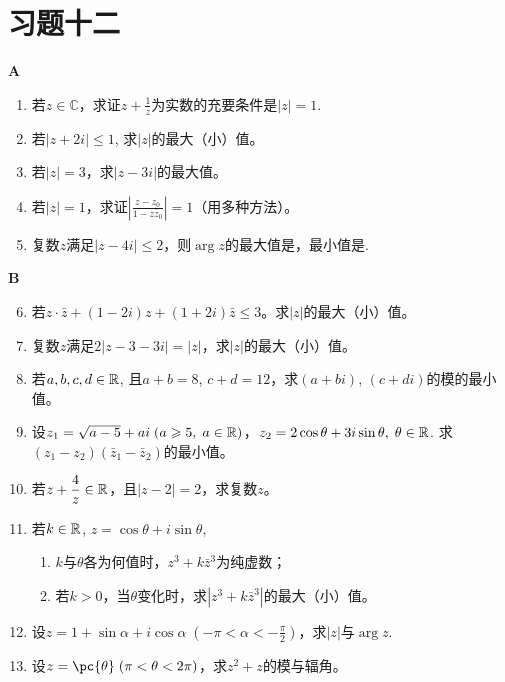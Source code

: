 \section*{习题十二}
\begin{center}
    \bfseries A
\end{center}

\begin{enumerate}
    \item 若$z\in\mathbb{C}$，求证$z+\frac{1}{z}$为实数的充要条件是$|z|=1$.
    \item   若$|z+2i|\le 1$, 求$|z|$的最大（小）值。
    \item   若$|z|=3$，求$|z-3i|$的最大值。
    \item   若$|z|=1$，求证$\left|\frac{z-z_0}{1-z\bar z_0}\right|=1$（用多种方法）。
    \item   复数$z$满足$|z-4i|\le 2$，则$\arg z$的最大值是\blank，最小值是\blank.
\end{enumerate}

\begin{center}
    \bfseries B
\end{center}

\begin{enumerate}\setcounter{enumi}{5}
    \item 若$z\cdot \bar z+(1-2i)z+(1+2i)\bar z\le 3$。求$|z|$的最大（小）值。
\item 复数$z$满足$2|z-3-3i|=|z|$，求$|z|$的最大（小）值。
\item 若$a,b,c,d\in\mathbb{R}$, 且$a+b=8$, $c+d=12$，求$(a+bi)$, $(c+di)$的模的最小值。
\item 设$z_1=\sqrt{a-5}+ai\; (a\geqslant 5,\; a\in\mathbb{R})$，$z_2=2\cos\theta+3i\sin\theta,\; \theta\in\mathbb{R}$. 求$(z_1-z_2)(\bar z_1-\bar z_2)$的最小值。
\item 若$z+\dfrac{4}{z}\in\mathbb{R}$，且$|z-2|=2$，求复数$z$。
\item 若$k\in\mathbb{R}$, $z=\cos\theta+i\sin\theta$,
\begin{enumerate}[(1)]
\item $k$与$\theta$各为何值时，$z^3+k\bar z^3$为纯虚数；
\item 若$k>0$，当$\theta$变化时，求$|z^3+k\bar z^3|$的最大（小）值。
\end{enumerate}

    \item 设$z=1+\sin\alpha+i\cos\alpha\; \left(-\pi<\alpha<-\frac{\pi}{2}\right)$，求$|z|$与$\arg z$.
    \item 设$z=\pc{\theta}\; (\pi<\theta<2\pi)$，求$z^2+z$的模与辐角。
\end{enumerate}


